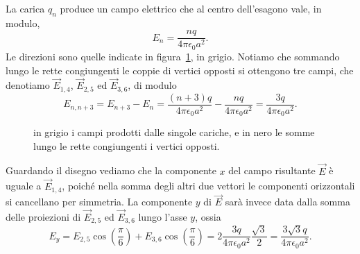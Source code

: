 \documentclass[10pt]{gulartcl}
\newcommand{\hexagon}{%
    \newdimen\side
    \side = 2cm
    \draw[densely dashed] (0:\side) \foreach \angle in {60, 120, ..., 360}{
        -- (\angle:\side)
    };
    \foreach \i/\pos in
        {1/right, 2/above, 3/above, 4/left, 5/below, 6/below}{
        \node[inner sep=1pt, circle, draw, fill, label={\pos:{$q_{\i}$}}]
            at ({60 * (\i - 1)}:\side) {};
    };}
\begin{document}
\begin{solution}
La carica $q_n$ produce un campo elettrico che al centro dell’esagono vale,
in modulo,
\begin{equation}
    E_n = \frac{n q}{4 \pi \epsilon_0 a^2}.
\end{equation}
Le direzioni sono quelle indicate in figura~\ref{fig:six-vectors}, in
grigio. Notiamo che sommando lungo le rette congiungenti le coppie di
vertici opposti si ottengono tre campi, che denotiamo $\vec{E}_{1, 4}$,
$\vec{E}_{2, 5}$ ed $\vec{E}_{3, 6}$, di modulo
\begin{equation}
    E_{n, n + 3} = E_{n + 3} - E_{n} = \frac{(n + 3) q}{4 \pi \epsilon_0
    a^{2}} - \frac{n q}{4 \pi \epsilon_0 a^{2}} = \frac{3 q}{4 \pi
\epsilon_0 a^2}.
\end{equation}

\begin{figure}
    \centering
    \caption{in grigio i campi prodotti dalle singole cariche, e in nero le
    somme lungo le rette congiungenti i vertici opposti.}
    \label{fig:six-vectors}
\end{figure}

Guardando il disegno vediamo che la componente $x$ del campo risultante
$\vec{E}$ è uguale a $\vec{E}_{1, 4}$, poiché nella somma degli altri due
vettori le componenti orizzontali si cancellano per simmetria.  La
componente $y$ di $\vec{E}$ sarà invece data dalla somma delle proiezioni
di $\vec{E}_{2, 5}$ ed $\vec{E}_{3, 6}$ lungo l’asse $y$, ossia
\begin{equation}
    E_{y} = E_{2, 5} \cos\left(\frac{\pi}{6}\right) + E_{3, 6}
    \cos\left(\frac{\pi}{6}\right) = 2 \frac{3q}{4 \pi \epsilon_0 a^{2}}
    \frac{\sqrt{3}}{2} = \frac{3 \sqrt{3} q}{4 \pi \epsilon_{0} a^{2}}.
\end{equation}


\end{solution}
\end{document}
